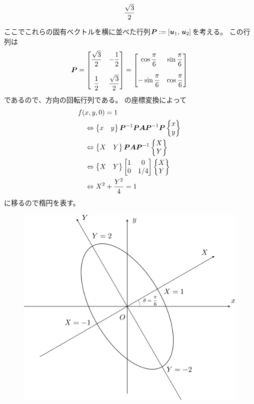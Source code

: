 \begin{ans*}
\begin{enumerate}[label=(\arabic*)]
\begin{enumerate}[label=(\roman*)]
\begin{gather}
{          \displaystyle\frac{\sqrt{3}}{2}
        }
      \end{gather}
    \end{enumerate}
    ここでこれらの固有ベクトルを横に並べた行列$\bm{P} := [{\bm{u}}_1 ,\, {\bm{u}}_2]$を考える。
    この行列は
    \begin{gather}
      \bm{P}
      =
      \begin{bmatrix}
          \displaystyle \frac{\sqrt{3}}{2} & \displaystyle -\frac{1}{2} \\
          \\
          \displaystyle \frac{1}{2} & \displaystyle \frac{\sqrt{3}}{2}
      \end{bmatrix} =
      \begin{bmatrix}
        \displaystyle \cos\frac{\pi}{6} &\displaystyle \sin\frac{\pi}{6} \\
        & \\
        \displaystyle -\sin\frac{\pi}{6} &\displaystyle \cos\frac{\pi}{6} \\
      \end{bmatrix}
    \end{gather}
    であるので、方向の回転行列である。
    の座標変換によって
    \begin{align}
      &f(x, y, 0) = 1 \\
      &\quad\Leftrightarrow
      \begin{Bmatrix}x & y\end{Bmatrix}\bm{P}^{-1}\bm{P}\bm{A}\bm{P}^{-1}\bm{P}\begin{Bmatrix}x \\ y\end{Bmatrix} \\
      &\quad\Leftrightarrow
      \begin{Bmatrix}X & Y\end{Bmatrix}\bm{P}\bm{A}\bm{P}^{-1}\begin{Bmatrix}X \\ Y\end{Bmatrix} \\
      &\quad\Leftrightarrow
      \begin{Bmatrix}X & Y\end{Bmatrix}\begin{bmatrix}1 & 0 \\ 0 & 1/4\end{bmatrix}\begin{Bmatrix}X \\ Y\end{Bmatrix} \\
      &\quad\Leftrightarrow
      X^2 + \frac{Y^2}{4} = 1
    \end{align}
    に移るので楕円を表す。

    \begin{figure}[H]\centering
      \includegraphics[width=.6\linewidth]{./src/fig/Basic/B_2020_spring_fxy0.png}
    \end{figure}

  \end{enumerate}
\end{ans*}
